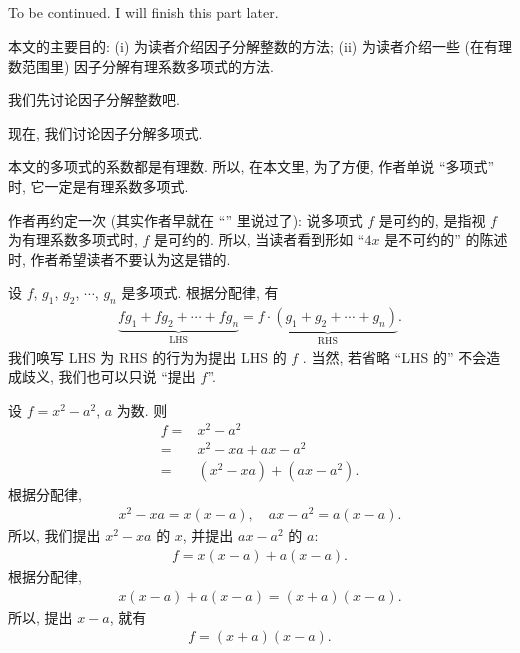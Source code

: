 \subsection*{\Factorization}
\markright{\Factorization}

To be continued. I will finish this part later.

本文的主要目的: (i) 为读者介绍因子分解整数的方法; (ii) 为读者介绍一些 (在有理数范围里) 因子分解有理系数多项式的方法.

我们先讨论因子分解整数吧.

\myLine

现在, 我们讨论因子分解多项式.

本文的多项式的系数都是有理数. 所以, 在本文里, 为了方便, 作者单说 ``多项式'' 时, 它一定是有理系数多项式.

作者再约定一次 (其实作者早就在 ``\PolynomialsOverZAndOverQ '' 里说过了): 说多项式 $f$ 是可约的, 是指视 $f$ 为有理系数多项式时, $f$ 是可约的. 所以, 当读者看到形如 ``$4x$ 是不可约的'' 的陈述时, 作者希望读者不要认为这是错的.

\begin{definition}
    设 $f$, $g_1$, $g_2$, $\cdots$, $g_n$ 是多项式. 根据分配律, 有
    \begin{align*}
        \underbrace{fg_1 + fg_2 + \cdots + fg_n}_{\text{LHS}} = \underbrace{f \cdot (g_1 + g_2 + \cdots + g_n)}_{\text{RHS}}.
    \end{align*}
    我们唤写 LHS 为 RHS 的行为为提出 LHS 的 $f$ . 当然, 若省略 ``LHS 的'' 不会造成歧义, 我们也可以只说 ``提出 $f$''.
\end{definition}

\begin{example}
    设 $f = x^2 - a^2$, $a$ 为数. 则
    \begin{align*}
        f
        = {} & x^2 - a^2                \\
        = {} & x^2 - xa + ax - a^2      \\
        = {} & (x^2 - xa) + (ax - a^2).
    \end{align*}
    根据分配律,
    \begin{align*}
        x^2 - xa = x(x - a), \quad ax - a^2 = a(x - a).
    \end{align*}
    所以, 我们提出 $x^2 - xa$ 的 $x$, 并提出 $ax - a^2$ 的 $a$:
    \begin{align*}
        f = x(x - a) + a(x - a).
    \end{align*}
    根据分配律,
    \begin{align*}
        x(x - a) + a(x - a) = (x + a)(x - a).
    \end{align*}
    所以, 提出 $x-a$, 就有
    \begin{align*}
        f = (x + a)(x - a).
    \end{align*}
\end{example}

